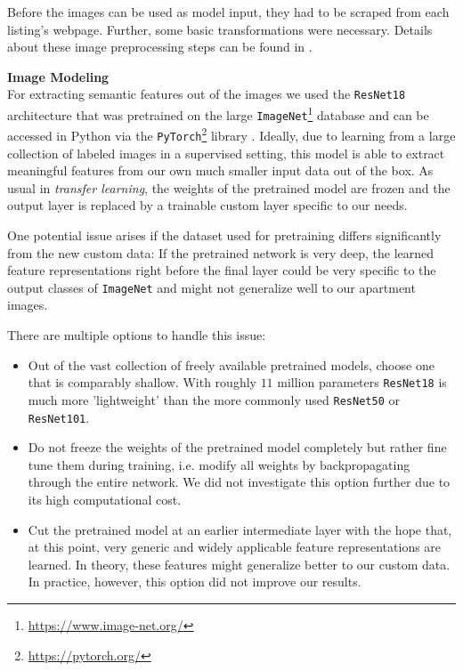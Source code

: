 Before the images can be used as model input, they had to be scraped from each listing's webpage.
Further, some basic transformations were necessary.
Details about these image preprocessing steps can be found in .


\textbf{Image Modeling} \\
For extracting semantic features out of the images we used the \texttt{ResNet18} architecture that was pretrained on the large \texttt{ImageNet}\footnote{\url{https://www.image-net.org/}} database \citep{russakovsky2015} and can be accessed in Python via the \texttt{PyTorch}\footnote{\url{https://pytorch.org/}} library \citep{paszke2019}.
Ideally, due to learning from a large collection of labeled images in a supervised setting, this model is able to extract meaningful features from our own much smaller input data out of the box.
As usual in \emph{transfer learning}, the weights of the pretrained model are frozen and the output layer is replaced by a trainable custom layer specific to our needs.

One potential issue arises if the dataset used for pretraining differs significantly from the new custom data:
If the pretrained network is very deep, the learned feature representations right before the final layer could be very specific to the output classes of \texttt{ImageNet} and might not generalize well to our apartment images.

There are multiple options to handle this issue:
\begin{itemize}
  \item Out of the vast collection of freely available pretrained models, choose one that is comparably shallow.
        With roughly $11$ million parameters \texttt{ResNet18} is much more 'lightweight' than the more commonly used \texttt{ResNet50} or \texttt{ResNet101}.
  \item Do not freeze the weights of the pretrained model completely but rather fine tune them during training, i.e. modify all weights by backpropagating through the entire network.
        We did not investigate this option further due to its high computational cost.
  \item Cut the pretrained model at an earlier intermediate layer with the hope that, at this point, very generic and widely applicable feature representations are learned.
        In theory, these features might generalize better to our custom data.
        In practice, however, this option did not improve our results.
\end{itemize}

